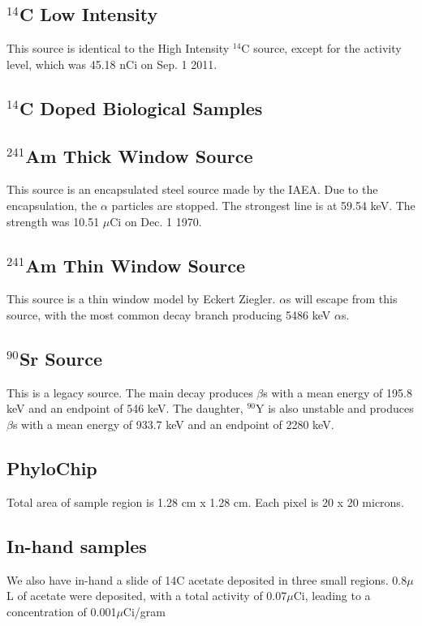 \documentclass[11pt]{article}
\newcommand{\nuc}[2]{\ensuremath{^{#1}}#2}
\begin{document}
\subsection{\nuc{14}{C} Low Intensity}
This source is identical to the High Intensity \nuc{14}{C} source, except for the activity level, which was 45.18 nCi on Sep. 1 2011.
\subsection{\nuc{14}{C} Doped Biological Samples}
\subsection{\nuc{241}{Am} Thick Window Source}
This source is an encapsulated steel source made by the IAEA. Due to the encapsulation, the $\alpha$ particles are stopped. The strongest line is at 59.54 keV. The strength was 10.51 $\mu$Ci on Dec. 1 1970.
\subsection{\nuc{241}{Am} Thin Window Source}
This source is a thin window model by Eckert Ziegler. $\alpha$s will escape from this source, with the most common decay branch producing 5486 keV $\alpha$s. 
\subsection{\nuc{90}{Sr} Source }
This is a legacy source. The main decay produces $\beta$s with a mean energy of 195.8 keV and an endpoint of 546 keV. The daughter, \nuc{90}{Y} is also unstable and produces $\beta$s with a mean energy of 933.7 keV and an endpoint of  2280 keV.
\subsection{PhyloChip}
Total area of sample region is 1.28 cm x 1.28 cm. Each pixel is 20 x 20 microns.
\subsection{In-hand samples}
We also have in-hand a slide of 14C acetate deposited in three small regions. 0.8$\mu$L of acetate were deposited, with a total activity of 0.07$\mu$Ci, leading to a concentration of 0.001$\mu$Ci/gram
\end{document}
